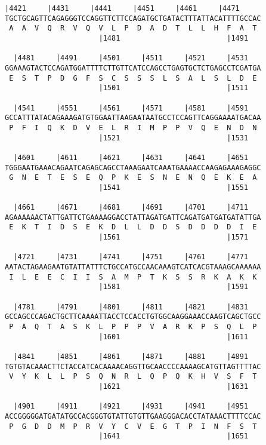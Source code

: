 \documentclass{article}
\begin{document}
\newpage
\begin{Verbatim}[fontfamily=courier]
  |4421     |4431     |4441     |4451     |4461     |4471   
TGCTGCAGTTCAGAGGGTCCAGGTTCTTCCAGATGCTGATACTTTATTACATTTTGCCAC
 A  A  V  Q  R  V  Q  V  L  P  D  A  D  T  L  L  H  F  A  T 
                      |1481                         |1491   

  |4481     |4491     |4501     |4511     |4521     |4531   
GGAAAGTACTCCAGATGGATTTTCTTGTTCATCCAGCCTGAGTGCTCTGAGCCTCGATGA
 E  S  T  P  D  G  F  S  C  S  S  S  L  S  A  L  S  L  D  E 
                      |1501                         |1511   

  |4541     |4551     |4561     |4571     |4581     |4591   
GCCATTTATACAGAAAGATGTGGAATTAAGAATAATGCCTCCAGTTCAGGAAAATGACAA
 P  F  I  Q  K  D  V  E  L  R  I  M  P  P  V  Q  E  N  D  N 
                      |1521                         |1531   

  |4601     |4611     |4621     |4631     |4641     |4651   
TGGGAATGAAACAGAATCAGAGCAGCCTAAAGAATCAAATGAAAACCAAGAGAAAGAGGC
 G  N  E  T  E  S  E  Q  P  K  E  S  N  E  N  Q  E  K  E  A 
                      |1541                         |1551   

  |4661     |4671     |4681     |4691     |4701     |4711   
AGAAAAAACTATTGATTCTGAAAAGGACCTATTAGATGATTCAGATGATGATGATATTGA
 E  K  T  I  D  S  E  K  D  L  L  D  D  S  D  D  D  D  I  E 
                      |1561                         |1571   

  |4721     |4731     |4741     |4751     |4761     |4771   
AATACTAGAAGAATGTATTATTTCTGCCATGCCAACAAAGTCATCACGTAAAGCAAAAAA
 I  L  E  E  C  I  I  S  A  M  P  T  K  S  S  R  K  A  K  K 
                      |1581                         |1591   

  |4781     |4791     |4801     |4811     |4821     |4831   
GCCAGCCCAGACTGCTTCAAAATTACCTCCACCTGTGGCAAGGAAACCAAGTCAGCTGCC
 P  A  Q  T  A  S  K  L  P  P  P  V  A  R  K  P  S  Q  L  P 
                      |1601                         |1611   

  |4841     |4851     |4861     |4871     |4881     |4891   
TGTGTACAAACTTCTACCATCACAAAACAGGTTGCAACCCCAAAAGCATGTTAGTTTTAC
 V  Y  K  L  L  P  S  Q  N  R  L  Q  P  Q  K  H  V  S  F  T 
                      |1621                         |1631   

  |4901     |4911     |4921     |4931     |4941     |4951   
ACCGGGGGATGATATGCCACGGGTGTATTGTGTTGAAGGGACACCTATAAACTTTTCCAC
 P  G  D  D  M  P  R  V  Y  C  V  E  G  T  P  I  N  F  S  T 
                      |1641                         |1651   

\end{Verbatim}
\end{document}

